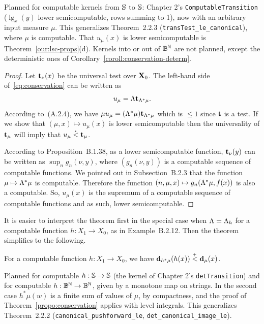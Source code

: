 \begin{formalization}
Planned for computable kernels from $\mathbb{S}$ to $\mathbb{S}$: Chapter 2's \texttt{ComputableTransition}
($\lg_{x}(y)$ lower semicomputable, rows summing to 1), now with an arbitrary input measure
$\mu$. This generalizes Theorem~2.2.3 (\texttt{transTest\_le\_canonical}), where $\mu$ is
computable. That $u_{\mu}(x)$ is lower semicomputable is Theorem~\ref{our:lsc-props}(d). Kernels
into or out of $\mathbb{B}^{\mathbb{N}}$ are not planned, except the deterministic ones of
Corollary~\ref{coroll:conservation-determ}.
\end{formalization}
 \begin{proof}
Let \( \mathbf{t}_{\nu}(x) \) be the universal test over \( \mathbf{X}_{0} \).
The left-hand side of~\eqref{eq:conservation} can be written as
 \[
  u_{\mu} = \Lambda \mathbf{t}_{\Lambda^{*}\mu}.
 \]
According to~(A.2.4), we have 
\( \mu u_{\mu} = (\Lambda^{*}\mu) \mathbf{t}_{\Lambda^{*}\mu} \) which is \( \le 1 \) since \( \mathbf{t} \) is
a test.
If we show that \( (\mu,x) \mapsto u_{\mu}(x) \) is lower semicomputable
then the universality of \( \mathbf{t}_{\mu} \) will imply
that \( u_{\mu} \stackrel{{}_*}{<} \mathbf{t}_{\mu} \).

According to Proposition~B.1.38, as
a lower semicomputable function, \( \mathbf{t}_{\nu}(y) \) can be written as 
\( \sup_{n} g_{n}(\nu, y) \), where \( (g_{n}(\nu, y)) \) is a computable sequence
of computable functions.
We pointed out in Subsection~B.2.3 that the function 
\( \mu \mapsto \Lambda^{*}\mu \) is computable.
Therefore the function \( (n, \mu, x) \mapsto g_{n}(\Lambda^{*}\mu, f(x)) \) 
is also a computable.
So, \( u_{\mu}(x) \) is the supremum of a computable sequence of computable
functions and as such, lower semicomputable.
 \end{proof}

It is easier to interpret the theorem first in the special case when
\( \Lambda = \Lambda_{h} \) for a computable function \( h : X_{1} \to X_{0} \),
as in Example~B.2.12.
Then the theorem simplifies to the following.

 \begin{corollary}\label{coroll:conservation-determ}
For a computable function \( h : X_{1} \to X_{0} \), we have
\( \mathbf{d}_{h^{*}\mu}(h(x)) \stackrel{{}_+}{<} \mathbf{d}_{\mu}(x) \).
 \end{corollary}

\begin{formalization}
Planned for computable $h:\mathbb{S}\to\mathbb{S}$ (the kernel of Chapter 2's \texttt{detTransition}) and for
computable $h:\mathbb{B}^{\mathbb{N}}\to\mathbb{B}^{\mathbb{N}}$, given by a monotone map on strings. In the second case
$h^{*}\mu(w)$ is a finite sum of values of $\mu$, by compactness, and the proof of
Theorem~\ref{propo:conservation} applies with level integrals. This generalizes
Theorem~2.2.2 (\texttt{canonical\_pushforward\_le}, \texttt{det\_canonical\_image\_le}).
\end{formalization}

